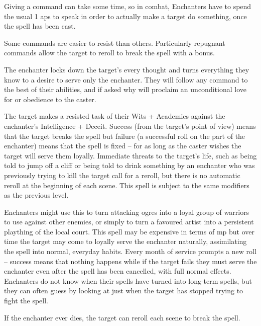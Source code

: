 \begin{multicols}{2}

\noindent
Giving a command can take some time, so in combat, Enchanters have to spend the usual 1 \glspl{ap} to speak in order to actually make a target do something, once the spell has been cast.

Some commands are easier to resist than others. Particularly repugnant commands allow the target to reroll to break the spell with a bonus.

\spelllevel


The enchanter locks down the target's every thought and turns everything they know to a desire to serve only the enchanter. They will follow any command to the best of their abilities, and if asked why will proclaim an unconditional love for or obedience to the caster.

The target makes a resisted task of their Wits + Academics against the enchanter's Intelligence + Deceit.
Success (from the target's point of view) means that the target breaks the spell but failure (a successful roll on the part of the enchanter) means that the spell is fixed -- for as long as the caster wishes the target will serve them loyally.
Immediate threats to the target's life, such as being told to jump off a cliff or being told to drink something by an enchanter who was previously trying to kill the target call for a reroll, but there is no automatic reroll at the beginning of each scene.
This spell is subject to the same modifiers as the previous level.

Enchanters might use this to turn attacking ogres into a loyal group of warriors to use against other enemies, or simply to turn a favoured artist into a persistent plaything of the local court. This spell may be expensive in terms of \gls{mp} but over time the target may come to loyally serve the enchanter naturally, assimilating the spell into normal, everyday habits. Every month of service prompts a new roll -- success means that nothing happens while if the target fails they must serve the enchanter even after the spell has been cancelled, with full normal effects. Enchanters do not know when their spells have turned into long-term spells, but they can often guess by looking at just when the target has stopped trying to fight the spell.

If the enchanter ever dies, the target can reroll each scene to break the spell.


\end{multicols}
